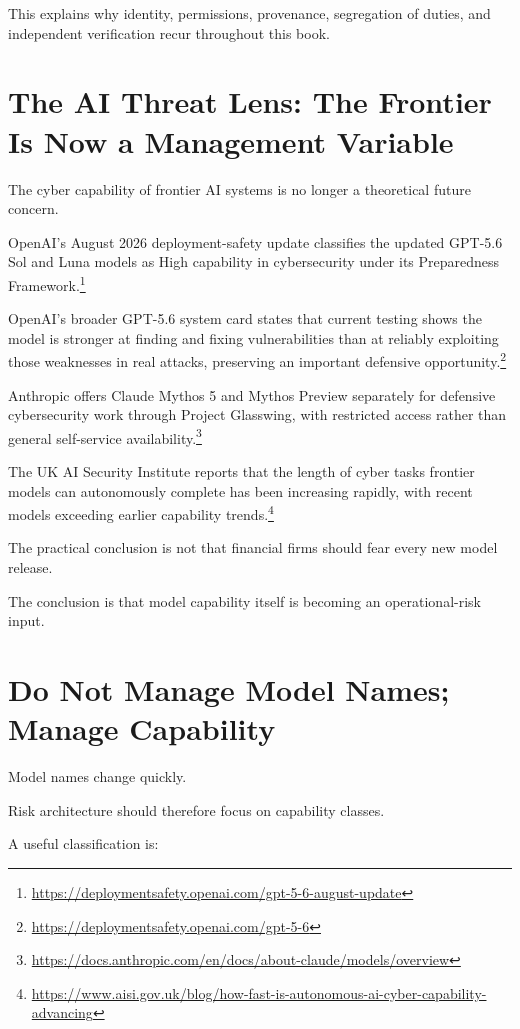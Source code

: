 This explains why identity, permissions, provenance, segregation of duties, and independent verification recur throughout this book.

\section{The AI Threat Lens: The Frontier Is Now a Management Variable}

The cyber capability of frontier AI systems is no longer a theoretical future concern.

OpenAI's August 2026 deployment-safety update classifies the updated GPT-5.6 Sol and Luna models as High capability in cybersecurity under its Preparedness Framework.\footnote{\url{https://deploymentsafety.openai.com/gpt-5-6-august-update}}

OpenAI's broader GPT-5.6 system card states that current testing shows the model is stronger at finding and fixing vulnerabilities than at reliably exploiting those weaknesses in real attacks, preserving an important defensive opportunity.\footnote{\url{https://deploymentsafety.openai.com/gpt-5-6}}

Anthropic offers Claude Mythos 5 and Mythos Preview separately for defensive cybersecurity work through Project Glasswing, with restricted access rather than general self-service availability.\footnote{\url{https://docs.anthropic.com/en/docs/about-claude/models/overview}}

The UK AI Security Institute reports that the length of cyber tasks frontier models can autonomously complete has been increasing rapidly, with recent models exceeding earlier capability trends.\footnote{\url{https://www.aisi.gov.uk/blog/how-fast-is-autonomous-ai-cyber-capability-advancing}}

The practical conclusion is not that financial firms should fear every new model release.

The conclusion is that model capability itself is becoming an operational-risk input.

\section{Do Not Manage Model Names; Manage Capability}

Model names change quickly.

Risk architecture should therefore focus on capability classes.

A useful classification is:

